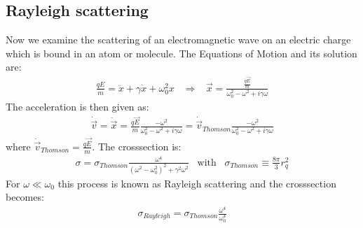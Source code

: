 \subsection{Rayleigh scattering}

Now we examine the scattering of an electromagnetic wave on an electric charge
which is bound in an atom or molecule. The Equations of Motion and its
solution are:
\begin{align*}
    \frac{q E}{m} = \ddot{x} + \gamma \dot{x} + \omega_0^2 x
    \hspace{10pt} \Rightarrow \hspace{10pt}
    \vec{x} = \frac{\frac{q \vec{E}}{m}}{\omega_0^2 - \omega^2 + i \gamma \omega}
\end{align*}
The acceleration is then given as:
\begin{align*}
    \dot{\vec{v}} = \ddot{\vec{x}} = \frac{q \vec{E}}{m} \frac{-\omega^2}{\omega_0^2 - \omega^2 + i \gamma \omega}
    = \dot{\vec{v}}_{Thomson} \frac{-\omega^2}{\omega_0^2 - \omega^2 + i \gamma \omega}
\end{align*}
where $\dot{\vec{v}}_{Thomson} = \frac{q \vec{E}}{m}$. The crosssection is:
\begin{align*}
    \sigma = \sigma_{Thomson} \frac{\omega^4}{(\omega^2 - \omega_0^2)^2 + \gamma^2 \omega^2}
    \hspace{10pt} \text{with} \hspace{10pt}
    \sigma_{Thomson} \equiv \frac{8 \pi}{3} r_q^2
\end{align*}
For $\omega \ll \omega_0$ this process is known as Rayleigh scattering and the
crosssection becomes:
\begin{align*}
    \sigma_{Rayleigh} = \sigma_{Thomson} \frac{\omega^4}{\omega_0^4}
\end{align*}
